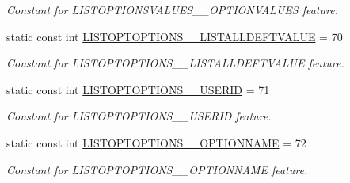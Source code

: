 \begin{DoxyCompactItemize}
\begin{DoxyCompactList}\small\item\em Constant for LISTOPTIONSVALUES\_\-\_\-OPTIONVALUES feature. \item\end{DoxyCompactList}\item 
\hypertarget{classUMS__Data_1_1UMS__DataPackage_abafe59bd36045623f3f930dc491a49a9}{
static const int \hyperlink{classUMS__Data_1_1UMS__DataPackage_abafe59bd36045623f3f930dc491a49a9}{LISTOPTOPTIONS\_\-\_\-LISTALLDEFTVALUE} = 70}
\label{classUMS__Data_1_1UMS__DataPackage_abafe59bd36045623f3f930dc491a49a9}

\begin{DoxyCompactList}\small\item\em Constant for LISTOPTOPTIONS\_\-\_\-LISTALLDEFTVALUE feature. \item\end{DoxyCompactList}\item 
\hypertarget{classUMS__Data_1_1UMS__DataPackage_a1db822d1b2beace3b919372744d93231}{
static const int \hyperlink{classUMS__Data_1_1UMS__DataPackage_a1db822d1b2beace3b919372744d93231}{LISTOPTOPTIONS\_\-\_\-USERID} = 71}
\label{classUMS__Data_1_1UMS__DataPackage_a1db822d1b2beace3b919372744d93231}

\begin{DoxyCompactList}\small\item\em Constant for LISTOPTOPTIONS\_\-\_\-USERID feature. \item\end{DoxyCompactList}\item 
\hypertarget{classUMS__Data_1_1UMS__DataPackage_a81bac63634637b26649349f14a633ada}{
static const int \hyperlink{classUMS__Data_1_1UMS__DataPackage_a81bac63634637b26649349f14a633ada}{LISTOPTOPTIONS\_\-\_\-OPTIONNAME} = 72}
\label{classUMS__Data_1_1UMS__DataPackage_a81bac63634637b26649349f14a633ada}

\begin{DoxyCompactList}\small\item\em Constant for LISTOPTOPTIONS\_\-\_\-OPTIONNAME feature. \item\end{DoxyCompactList}\end{DoxyCompactItemize}
